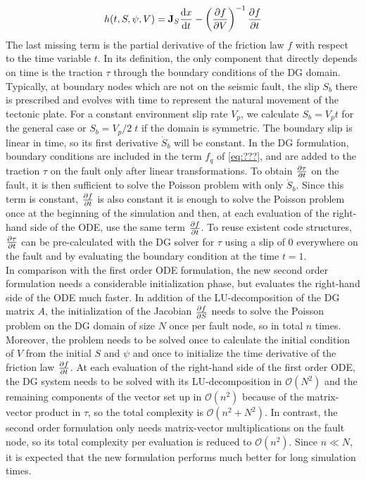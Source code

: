 \begin{equation}
	h(t,S,\psi,V) = \mathbf{J}_{S}\dv{x}{t} -\left(\pdv{f}{V}\right)^{-1}\pdv{f}{t}
\end{equation}
The last missing term is the partial derivative of the friction law $f$ with respect to the time variable $t$. In its definition, the only component that directly depends on time is the traction $\tau$ through the boundary conditions of the DG domain. Typically, at boundary nodes which are not on the seismic fault, the slip $S_b$ there is prescribed and evolves with time to represent the natural movement of the tectonic plate. For a constant environment slip rate $V_p$, we calculate $S_b=V_pt$ for the general case or $S_b=V_p/2\;t$ if the domain is symmetric. The boundary slip is linear in time, so its first derivative $\dot{S}_b$ will be constant. In the DG formulation, boundary conditions are included in the term $f_q$ of \autoref{eq:???}, and are added to the traction $\tau$ on the fault only after linear transformations. To obtain $\pdv{\tau}{t}$ on the fault, it is then sufficient to solve the Poisson problem with only $\dot{S}_b$. Since this term is constant, $\pdv{f}{t}$ is also constant it is enough to solve the Poisson problem once at the beginning of the simulation and then, at each evaluation of the right-hand side of the ODE, use the same term $\pdv{f}{t}$. To reuse existent code structures, $\pdv{\tau}{t}$ can be pre-calculated with the DG solver for $\tau$ using a slip of 0 everywhere on the fault and by evaluating the boundary condition at the time $t=1$. \\
In comparison with the first order ODE formulation, the new second order formulation needs a considerable initialization phase, but evaluates the right-hand side of the ODE much faster. In addition of the LU-decomposition of the DG matrix $A$, the initialization of the Jacobian $\pdv{f}{S}$ needs to solve the Poisson problem on the DG domain of size $N$ once per fault node, so in total $n$ times. Moreover, the problem needs to be solved once to calculate the initial condition of $V$ from the initial $S$ and $\psi$ and once to initialize the time derivative of the friction law $\pdv{f}{t}$. At each evaluation of the right-hand side of the first order ODE, the DG system needs to be solved with its LU-decomposition in $\mathcal{O}\left(N^2\right)$ and the remaining components of the vector set up in $\mathcal{O}\left(n^2\right)$ because of the matrix-vector product in $\tau$, so the total complexity is $\mathcal{O}\left(n^2+N^2\right)$. In contrast, the second order formulation only needs matrix-vector multiplications on the fault node, so its total complexity per evaluation is reduced to $\mathcal{O}\left(n^2\right)$. Since $n\ll N$, it is expected that the new formulation performs much better for long simulation times. \\
